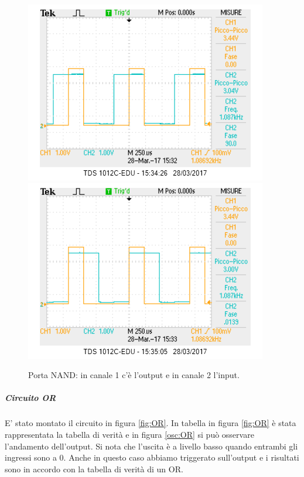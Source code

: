 \documentclass[10pt,a4paper]{article}
\begin{document}
\begin{figure}[!htb]
  \centering
  \includegraphics[scale=0.75]{and1.png}\includegraphics[scale=0.75]{and2.png}
\caption{Porta NAND: in canale 1 c'è l'output e in canale 2 l'input.\label{osc:AND}}
\end{figure}

\subparagraph{Circuito OR}

E' stato montato il circuito in figura \ref{fig:OR}. In tabella in figura \ref{fig:OR} è stata rappresentata la tabella di verità e in figura \ref{osc:OR} si può osservare l'andamento dell'output. Si nota che l'uscita è a livello basso quando entrambi gli ingressi sono a 0. Anche in questo caso abbiamo triggerato sull'output e i risultati sono in accordo con la tabella di verità di un OR.
\end{document}

